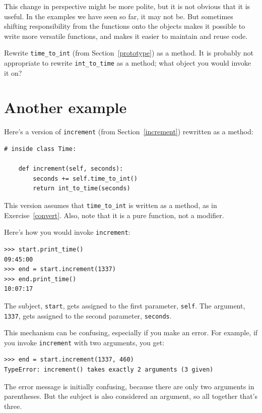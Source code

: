 \documentclass[10pt]{book}
\begin{document}
This change in perspective might be more polite, but it is not obvious
that it is useful.  In the examples we have seen so far, it may not
be.  But sometimes shifting responsibility from the functions onto the
objects makes it possible to write more versatile functions, and makes
it easier to maintain and reuse code.

\begin{exercise}
\label{convert}

Rewrite \verb"time_to_int" (from Section~\ref{prototype}) as a method.
It is probably not appropriate to rewrite \verb"int_to_time" as a
method; what object you would invoke it on?

\end{exercise}


\section{Another example}

Here's a version of {\tt increment} (from Section~\ref{increment})
rewritten as a method:

\begin{verbatim}
# inside class Time:

    def increment(self, seconds):
        seconds += self.time_to_int()
        return int_to_time(seconds)
\end{verbatim}
%
This version assumes that \verb"time_to_int" is written
as a method, as in Exercise~\ref{convert}.  Also, note that
it is a pure function, not a modifier.

Here's how you would invoke {\tt increment}:

\begin{verbatim}
>>> start.print_time()
09:45:00
>>> end = start.increment(1337)
>>> end.print_time()
10:07:17
\end{verbatim}
%
The subject, {\tt start}, gets assigned to the first parameter,
{\tt self}.  The argument, {\tt 1337}, gets assigned to the
second parameter, {\tt seconds}.

This mechanism can be confusing, especially if you make an error.
For example, if you invoke {\tt increment} with two arguments, you
get:

\begin{verbatim}
>>> end = start.increment(1337, 460)
TypeError: increment() takes exactly 2 arguments (3 given)
\end{verbatim}
%
The error message is initially confusing, because there are
only two arguments in parentheses.  But the subject is also
considered an argument, so all together that's three.
\end{document}
